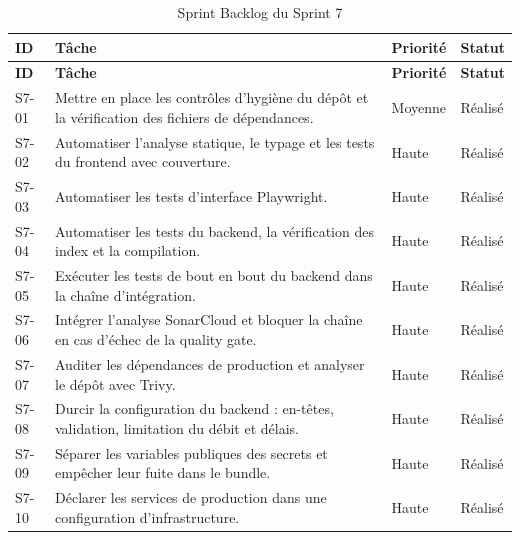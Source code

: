 {\footnotesize
\setlength{\tabcolsep}{4pt}
\begin{longtable}{|p{0.9cm}|>{\raggedright\arraybackslash}p{9.1cm}|>{\raggedright\arraybackslash}p{1.6cm}|>{\raggedright\arraybackslash}p{1.6cm}|}
\caption{Sprint Backlog du Sprint 7}
\label{tab:sprint7-backlog}\\
\hline
\textbf{ID} & \textbf{Tâche} & \textbf{Priorité} & \textbf{Statut} \\
\hline
\endfirsthead

\hline
\textbf{ID} & \textbf{Tâche} & \textbf{Priorité} & \textbf{Statut} \\
\hline
\endhead

S7-01 &
Mettre en place les contrôles d'hygiène du dépôt et la vérification des fichiers de dépendances. &
Moyenne & Réalisé \\
\hline

S7-02 &
Automatiser l'analyse statique, le typage et les tests du frontend avec couverture. &
Haute & Réalisé \\
\hline

S7-03 &
Automatiser les tests d'interface Playwright. &
Haute & Réalisé \\
\hline

S7-04 &
Automatiser les tests du backend, la vérification des index et la compilation. &
Haute & Réalisé \\
\hline

S7-05 &
Exécuter les tests de bout en bout du backend dans la chaîne d'intégration. &
Haute & Réalisé \\
\hline

S7-06 &
Intégrer l'analyse SonarCloud et bloquer la chaîne en cas d'échec de la quality gate. &
Haute & Réalisé \\
\hline

S7-07 &
Auditer les dépendances de production et analyser le dépôt avec Trivy. &
Haute & Réalisé \\
\hline

S7-08 &
Durcir la configuration du backend : en-têtes, validation, limitation du débit et délais. &
Haute & Réalisé \\
\hline

S7-09 &
Séparer les variables publiques des secrets et empêcher leur fuite dans le bundle. &
Haute & Réalisé \\
\hline

S7-10 &
Déclarer les services de production dans une configuration d'infrastructure. &
Haute & Réalisé \\
\hline


\end{longtable}}
